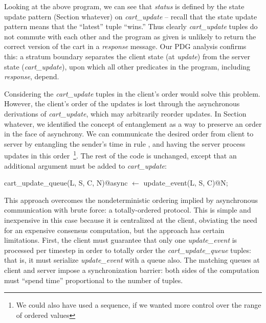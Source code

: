 Looking at the above program, we can see that {\em status} is defined by the
state update pattern (Section whatever) on {\em cart\_update} -- recall that
the state update pattern means that the ``latest'' tuple ``wins.'' Thus clearly
{\em cart\_update} tuples do not commute with each other
and the program as
given is unlikely to return the correct version of the cart in a {\em response}
message.  Our PDG analysis confirms this: a stratum boundary separates the client state
(at {\em update}) from the server state ({\em cart\_update}), upon which all other 
predicates in the program, including {\em response}, depend.

Considering the {\em cart\_update} tuples in the client's order would solve
this problem.  However, the client's order of the updates is lost through the
asynchronous derivations of {\em cart\_update}, which may arbitrarily reorder
updates.  In Section whatever, we identified the concept of entanglement as a
way to preserve an order in the face of asynchrony.  We can communicate the
desired order from client to server by entangling the sender's time in rule
, and having the server process updates in this order~\footnote{
We could also have used a sequence, if we wanted more control over the range of ordered
values}.
The rest of the code is unchanged, except that an additional argument must be
added to {\em cart\_update}:

\begin{Dedalus}
cart_update_queue(L, S, C, N)@async \(\leftarrow\)
    update_event(L, S, C)@N;
\end{Dedalus}

This approach overcomes the nondeterministic ordering implied by asynchronous
communication with brute force: a totally-ordered protocol. This is simple and
inexpensive in this case because it is centralized at the client, obviating the
need for an expensive consensus computation, but the approach has certain
limitations.  First, the client must guarantee that only one {\em
update\_event} is processed per timestep in order to totally order the {\em
cart\_update\_queue} tuples: that is, it must serialize {\em update\_event}
with a queue also.  The matching queues at client and server impose a
synchronization barrier: both sides of the computation must ``spend time''
proportional to the number of tuples.

